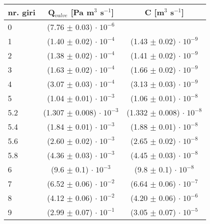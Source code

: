 \begin{center}
	\begin{tabular}{ l c c }
        \toprule
        nr. giri & Q$_{valve}$ [Pa m$^3$ s$^{-1}$] & C [m$^3$ s$^{-1}$] \\ 
        \midrule
        0   & (7.76 $\pm$ 0.03) $ \cdot \; 10^{-6}$ & \\
        1   & (1.40 $\pm$ 0.02) $ \cdot \; 10^{-4}$ & (1.43 $\pm$  0.02) $ \cdot \; 10^{-9}$ \\
        2   & (1.38 $\pm$ 0.02) $ \cdot \; 10^{-4}$ & (1.41 $\pm$  0.02) $ \cdot \; 10^{-9}$ \\
        3   & (1.63 $\pm$ 0.02) $ \cdot \; 10^{-4}$ & (1.66 $\pm$  0.02) $ \cdot \; 10^{-9}$ \\
        4   & (3.07 $\pm$ 0.03) $ \cdot \; 10^{-4}$ & (3.13 $\pm$  0.03) $ \cdot \; 10^{-9}$ \\
        5   & (1.04 $\pm$ 0.01) $ \cdot \; 10^{-3}$ & (1.06 $\pm$  0.01) $ \cdot \; 10^{-8}$ \\
        5.2 & (1.307 $\pm$ 0.008) $ \cdot \; 10^{-3}$ & (1.332 $\pm$ 0.008) $ \cdot \; 10^{-8}$ \\
        5.4 & (1.84 $\pm$ 0.01) $ \cdot \; 10^{-3}$ & (1.88 $\pm$  0.01) $ \cdot \; 10^{-8}$ \\
        5.6 & (2.60 $\pm$ 0.02) $ \cdot \; 10^{-3}$ & (2.65 $\pm$  0.02) $ \cdot \; 10^{-8}$ \\
        5.8 & (4.36 $\pm$ 0.03) $ \cdot \; 10^{-3}$ & (4.45 $\pm$  0.03) $ \cdot \; 10^{-8}$ \\
        6   &  (9.6 $\pm$ 0.1)  $ \cdot \; 10^{-3}$ & (9.8 $\pm$   0.1) $ \cdot \; 10^{-8}$ \\
        7   & (6.52 $\pm$ 0.06) $ \cdot \; 10^{-2}$ & (6.64 $\pm$  0.06) $ \cdot \; 10^{-7}$ \\
        8   & (4.12 $\pm$ 0.06) $ \cdot \; 10^{-2}$ & (4.20 $\pm$  0.06) $ \cdot \; 10^{-6}$ \\
        9   & (2.99 $\pm$ 0.07) $ \cdot \; 10^{-1}$ & (3.05 $\pm$  0.07) $ \cdot \; 10^{-5}$ \\
    \bottomrule

	\end{tabular}
\end{center}
